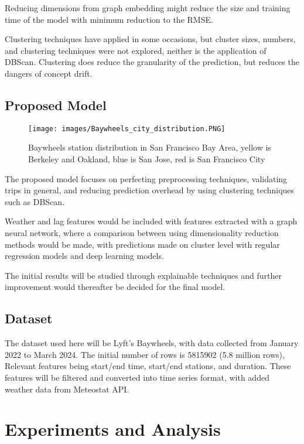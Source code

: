 \documentclass{article}
\begin{document}
Reducing dimensions from graph embedding might reduce the size and training time of the model with minimum reduction to the RMSE.

Clustering techniques have applied in some occasions, but cluster sizes, numbers, and clustering techniques were not explored, neither is the application of DBScan. Clustering does reduce the granularity of the prediction, but reduces the dangers of concept drift.

\subsection{Proposed Model}

\begin{figure}
\centering
\texttt{[image: images/Baywheels\_city\_distribution.PNG]}
\caption{Baywheels station distribution in San Francisco Bay Area, yellow is Berkeley and Oakland, blue is San Jose, red is San Francisco City}
\label{fig:SF_bay_area}
\end{figure}

The proposed model focuses on perfecting preprocessing techniques, validating trips in general, and reducing prediction overhead by using clustering techniques such as DBScan.

Weather and lag features would be included with features extracted with a graph neural network, where a comparison between using dimensionality reduction methods would be made, with predictions made on cluster level with regular regression models and deep learning models.

The initial results will be studied through explainable techniques and further improvement would thereafter be decided for the final model.

\subsection{Dataset}

The dataset used here will be Lyft's Baywheels\cite{LyftBikes}, with data collected from January 2022 to March 2024. The initial number of rows is 5815902 (5.8 million rows), Relevant features being start/end time, start/end stations, and duration. These features will be filtered and converted into time series format, with added weather data from Meteostat API\cite{meteostat}.

\section{Experiments and Analysis}
\end{document}
